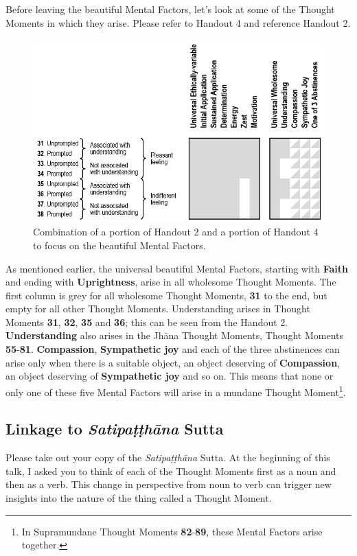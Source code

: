 Before leaving the beautiful Mental Factors, let’s look at some of the Thought Moments in which they arise. Please refer to Handout 4 and reference Handout 2.

\begin{figure}[h]
\centering
\includegraphics[width=0.9\linewidth]{./Diagrams/Wholesome}
\caption{Combination of a portion of Handout 2 and a portion of Handout 4 to focus on the beautiful Mental Factors.}
\label{fig:Wholesome}
\end{figure}

As mentioned earlier, the universal beautiful Mental Factors, starting with \textbf{Faith} and ending with \textbf{Uprightness}, arise in all wholesome Thought Moments. The first column is grey for all wholesome Thought Moments, \textbf{31} to the end, but empty for all other Thought Moments. Understanding arises in Thought Moments \textbf{31}, \textbf{32}, \textbf{35} and \textbf{36}; this can be seen from the Handout 2. \textbf{Understanding} also arises in the Jhāna Thought Moments, Thought Moments \textbf{55}-\textbf{81}. \textbf{Compassion}, \textbf{Sympathetic joy} and each of the three abstinences can arise only when there is a suitable object, an object deserving of \textbf{Compassion}, an object deserving of \textbf{Sympathetic joy} and so on. This means that none or only one of these five Mental Factors will arise in a mundane Thought Moment\footnote{In Supramundane Thought Moments \textbf{82}-\textbf{89}, these Mental Factors arise together.}.

\subsection*{Linkage to \textit{Satipaṭṭhāna} Sutta}

Please take out your copy of the \textit{Satipaṭṭhāna} Sutta. At the beginning of this talk, I asked you to think of each of the Thought Moments first as a noun and then as a verb. This change in perspective from noun to verb can trigger new insights into the nature of the thing called a Thought Moment.


